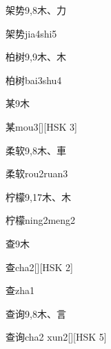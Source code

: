 \begin{entry}{架势}{9,8}{⽊、⼒}
  \begin{phonetics}{架势}{jia4shi5}
  \end{phonetics}
\end{entry}

\begin{entry}{柏树}{9,9}{⽊、⽊}
  \begin{phonetics}{柏树}{bai3shu4}
  \end{phonetics}
\end{entry}

\begin{entry}{某}{9}{⽊}
  \begin{phonetics}{某}{mou3}[][HSK 3]
  \end{phonetics}
\end{entry}

\begin{entry}{柔软}{9,8}{⽊、⾞}
  \begin{phonetics}{柔软}{rou2ruan3}
  \end{phonetics}
\end{entry}

\begin{entry}{柠檬}{9,17}{⽊、⽊}
  \begin{phonetics}{柠檬}{ning2meng2}
  \end{phonetics}
\end{entry}

\begin{entry}{查}{9}{⽊}
  \begin{phonetics}{查}{cha2}[][HSK 2]
  \end{phonetics}
  \begin{phonetics}{查}{zha1}
  \end{phonetics}
\end{entry}

\begin{entry}{查询}{9,8}{⽊、⾔}
  \begin{phonetics}{查询}{cha2 xun2}[][HSK 5]
  \end{phonetics}
\end{entry}

